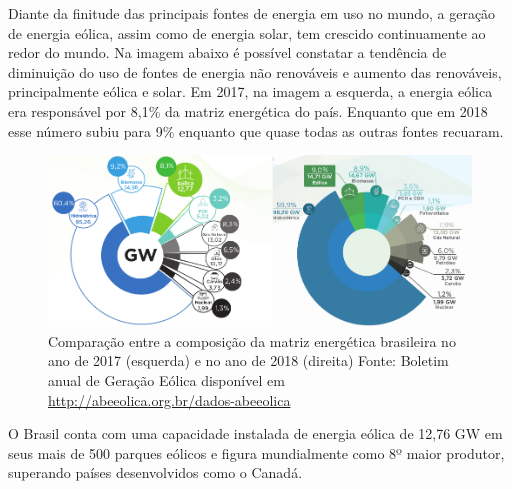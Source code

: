 \documentclass[
	12pt,				%
	openright,			%
	oneside,			%
	a4paper,			%
	english,			%
	french,				%
	spanish,			%
	brazil				%
	]{abntex2}
\begin{document}
Diante da finitude das principais fontes de energia em uso no mundo, a geração de energia eólica, assim como de energia solar, tem crescido continuamente ao redor do mundo. Na imagem abaixo é possível constatar a tendência de diminuição do uso de fontes de energia não renováveis e aumento das renováveis, principalmente eólica e solar. Em 2017, na imagem a esquerda, a energia eólica era responsável por 8,1\% da matriz energética do país. Enquanto que em 2018 esse número subiu para 9\% enquanto que quase todas as outras fontes recuaram.

\begin{figure}[h]
    \centering
	\includegraphics[width=\textwidth]{abe_2017_2018}
	\caption{Comparação entre a composição da matriz energética brasileira no ano de 2017 (esquerda) e no ano de 2018 (direita) Fonte: Boletim anual de Geração Eólica disponível em \url{http://abeeolica.org.br/dados-abeeolica}}
\end{figure}
\FloatBarrier

O Brasil conta com uma capacidade instalada de energia eólica de 12,76 GW em seus mais de 500 parques eólicos e figura mundialmente como 8º maior produtor, superando países desenvolvidos como o Canadá.
\end{document}
